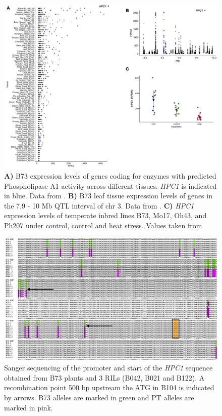 \documentclass[9pt,twocolumn,twoside,lineno]{BioRxiv}
\begin{document}
\clearpage

\begin{figure}[t]
\begin{center}
\includegraphics[width=0.8\paperwidth]{Sup_Figures/Sup_Fig_4.png}
\caption{\textbf{A)} B73 expression levels of genes coding for enzymes with predicted Phospholipase A1 activity across different tissues. \textit{HPC1} is indicated in blue. 
Data from \cite{Stelpflug2016-vr}.
\textbf{B)} B73 leaf tissue expression levels of genes in the 7.9 - 10 Mb QTL interval of chr 3. 
Data from \cite{Stelpflug2016-vr}.
\textbf{C)} \textit{HPC1} expression levels of temperate inbred lines B73, Mo17, Oh43, and Ph207 under control, control and heat stress. Values taken from \cite{Waters2017-nat}
} 
\label{SupFig4}
\end{center}
\end{figure} 

\clearpage

\begin{figure}[t]
\begin{center}
\includegraphics[width=0.9\paperwidth]{Sup_Figures/Sup_Fig_5.png}
\caption{Sanger sequencing of the promoter and start of the \textit{HPC1} sequence obtained from B73 plants and 3 RILs (B042, B021 and B122). A recombination point 500 bp upstream the ATG in B104 is indicated by arrows. B73 alleles are marked in green and PT alleles are marked in pink. 
}
\label{SupFig5}
\end{center}
\end{figure} 
\end{document}
